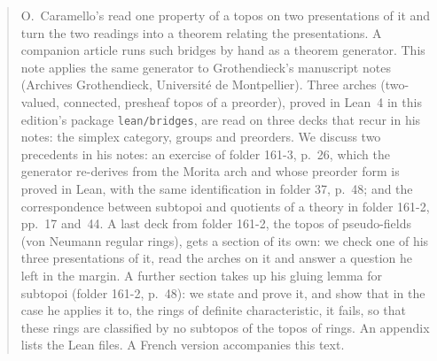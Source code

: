 \begin{abstract}
O.~Caramello's  read one property of a topos on two presentations of it and turn the two readings into a theorem relating the presentations. A companion article \cite{bridges-generator} runs such bridges by hand as a theorem generator. This note applies the same generator to Grothendieck's manuscript notes (Archives Grothendieck, Université de Montpellier). Three arches (two-valued, connected, presheaf topos of a preorder), proved in Lean~4 in this edition's package \texttt{lean/bridges}, are read on three decks that recur in his notes: the simplex category, groups and preorders. We discuss two precedents in his notes: an exercise of folder 161-3, p.~26, which the generator re-derives from the Morita arch and whose preorder form is proved in Lean, with the same identification in folder 37, p.~48; and the correspondence between subtopoi and quotients of a theory in folder 161-2, pp.~17 and~44. A last deck from folder 161-2, the topos of pseudo-fields (von Neumann regular rings), gets a section of its own: we check one of his three presentations of it, read the arches on it and answer a question he left in the margin. A further section takes up his gluing lemma for subtopoi (folder 161-2, p.~48): we state and prove it, and show that in the case he applies it to, the rings of definite characteristic, it fails, so that these rings are classified by no subtopos of the topos of rings. An appendix lists the Lean files. A French version accompanies this text.
\end{abstract}
